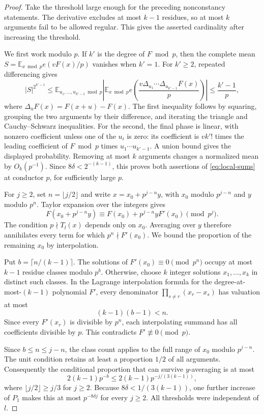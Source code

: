 \begin{proof}
Take the threshold large enough for the preceding nonconstancy statements.
The derivative excludes at most $k-1$ residues, so at most $k$ arguments
fail to be allowed regular.  This gives the asserted cardinality after
increasing the threshold.

We first work modulo $p$.  If $k'$ is the degree of $F\bmod p$, then
the complete mean $S=\mathbb E_{x\bmod p}e(vF(x)/p)$ vanishes when
$k'=1$.  For $k'\ge2$, repeated differencing gives
\[
 |S|^{2^{k'-1}}
 \le\mathbb E_{u_1,\ldots,u_{k'-1}\bmod p}
 \left|\mathbb E_{x\bmod p}
 e\left(\frac{v\Delta_{u_1}\cdots\Delta_{u_{k'-1}}F(x)}p\right)\right|
 \le\frac{k'-1}{p},
\]
where $\Delta_u F(x)=F(x+u)-F(x)$.  The first inequality follows by
squaring, grouping the two arguments by their difference, and iterating
the triangle and Cauchy--Schwarz inequalities.  For the second, the final
phase is linear, with nonzero coefficient unless one of the $u_i$ is
zero: its coefficient is $v k'!$ times the leading coefficient of
$F\bmod p$ times $u_1\cdots u_{k'-1}$.  A union bound gives the displayed
probability.  Removing at most $k$ arguments changes a normalized mean
by $O_k(p^{-1})$.  Since $8\delta<2^{-(k-1)}$, this proves both assertions
of \eqref{eq:local-sums} at conductor $p$, for sufficiently large $p$.

For $j\ge2$, set $n=\lfloor j/2\rfloor$ and write
$x=x_0+p^{j-n}y$, with $x_0$ modulo $p^{j-n}$ and $y$ modulo $p^n$.
Taylor expansion over the integers gives
\[
 F(x_0+p^{j-n}y)\equiv F(x_0)+p^{j-n}yF'(x_0)\pmod{p^j}.
\]
The condition $p\nmid T_l(x)$ depends only on $x_0$.  Averaging over $y$
therefore annihilates every term for which $p^n\nmid F'(x_0)$.
We bound the proportion of the remaining $x_0$ by interpolation.

Put $b=\lceil n/(k-1)\rceil$.  The solutions of
$F'(x_0)\equiv0\pmod{p^n}$ occupy at most $k-1$ residue classes modulo
$p^b$.  Otherwise, choose $k$ integer solutions $x_1,\ldots,x_k$ in
distinct such classes.  In the Lagrange interpolation formula for the
degree-at-most-$(k-1)$ polynomial $F'$, every denominator
$\prod_{s\ne r}(x_r-x_s)$ has valuation at most
\[
 (k-1)(b-1)<n.
\]
Since every $F'(x_r)$ is divisible by $p^n$, each interpolating summand
has all coefficients divisible by $p$.  This contradicts
$F'\not\equiv0\pmod p$.

Since $b\le n\le j-n$, the class count applies to the full range of
$x_0$ modulo $p^{j-n}$.  The unit condition retains at least a proportion
$1/2$ of all arguments.
Consequently the conditional proportion that can survive $y$-averaging
is at most
\[
 2(k-1)p^{-b}
 \le 2(k-1)p^{-j/(3(k-1))},
\]
where $\lfloor j/2\rfloor\ge j/3$ for $j\ge2$.  Because
$8\delta<1/(3(k-1))$, one further increase of $P_1$ makes this at most
$p^{-8\delta j}$ for every $j\ge2$.  All thresholds were independent of
$l$.
\end{proof}

